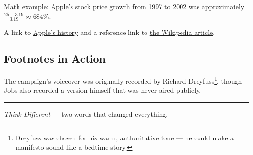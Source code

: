 \documentclass[11pt,a4paper]{article}
\begin{document}
Math example: Apple's stock price growth from 1997 to 2002 was approximately $\frac{25 - 3.19}{3.19} \approx 684\%$.

A link to \href{https://apple.com}{Apple's history} and a reference link to \href{https://en.wikipedia.org/wiki/Think_different}{the Wikipedia article}.

\subsection{Footnotes in Action}

The campaign's voiceover was originally recorded by Richard Dreyfuss\footnote{Dreyfuss was chosen for his warm, authoritative tone --- he could make a manifesto sound like a bedtime story.}, though Jobs also recorded a version himself that was never aired publicly.

\bigskip
\noindent\rule{\textwidth}{0.4pt}

\medskip
\noindent\emph{Think Different} --- two words that changed everything.
\end{document}
